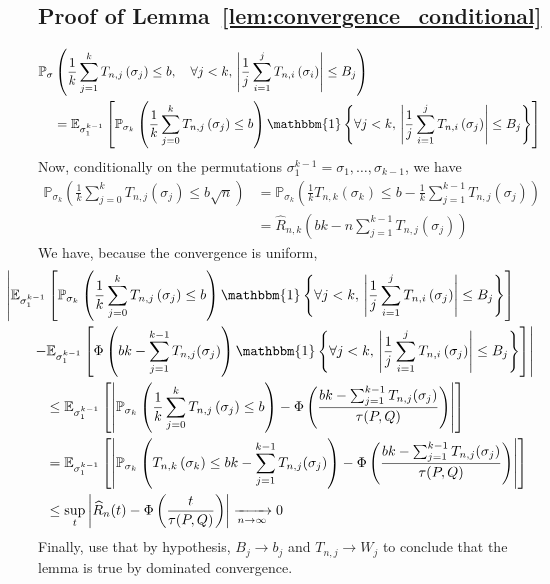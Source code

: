 \documentclass{article}
\theoremstyle{plain}
\theoremstyle{remark}
\renewcommand{\P}{\mathbb{P}}
\newcommand{\E}{\mathbb{E}}
\newcommand{\1}{\mathbbm{1}}
\numberwithin{equation}{section}
\begin{document}
\subsection{Proof of Lemma~\ref{lem:convergence_conditional}}\label{sec:proof_lem_conv}
\begin{align*}
\P_\sigma&\left(\frac{1}{k}\sum_{j=1}^k T_{n,j}\left(\sigma_j\right)\le b , \quad \forall j < k,\,  \left|\frac{1}{j}\sum_{i=1}^j T_{n,i}\left(\sigma_i\right)\right|\le  B_j  \right)\\
&= \E_{\sigma_1^{k-1}} \left[ \P_{\sigma_k}\left(\frac{1}{k}\sum_{j=0}^k T_{n,j}\left(\sigma_j\right)\le b \right)\1\left\{ \forall j < k,\,  \left|\frac{1}{j}\sum_{i=1}^j T_{n,i}\left(\sigma_j\right)\right|\le  B_j\right\}\right]
\end{align*}
Now, conditionally on the permutations $\sigma_1^{k-1}=\sigma_1,\dots,\sigma_{k-1}$, we have
\begin{align*}
\P_{\sigma_k}\left(\frac{1}{k}\sum_{j=0}^k T_{n,j}\left(\sigma_j\right)\le b \sqrt{n}\right) &= \P_{\sigma_k}\left( \frac{1}{k}T_{n,k}\left(\sigma_k\right)\le b -\frac{1}{k}\sum_{j=1}^{k-1}T_{n,j}\left(\sigma_j\right) \right)\\
&= \widehat{R}_{n,k}\left(bk-n\sum_{j=1}^{k-1}T_{n,j}\left(\sigma_j\right)\right)
\end{align*}
We have, because the convergence is uniform,
\begin{align*}
&\hspace{-3em}\left|\E_{\sigma_1^{k-1}} \left[ \P_{\sigma_k}\left(\frac{1}{k}\sum_{j=0}^k T_{n,j}\left(\sigma_j\right)\le b\right)\1\left\{ \forall j < k,\,  \left|\frac{1}{j}\sum_{i=1}^j T_{n,i}\left(\sigma_j\right)\right|\le  B_j\right\}\right]\right.\\
&\hspace{-1em}\left.- \E_{\sigma_1^{k-1}} \left[ \Phi\left( bk - \sum_{j=1}^{k-1}T_{n,j}(\sigma_j) \right)\1\left\{ \forall j < k,\,  \left|\frac{1}{j}\sum_{i=1}^j T_{n,i}\left(\sigma_j\right)\right|\le  B_j\right\}\right] \right|\\
&\le \E_{\sigma_1^{k-1}} \left[ \left|\P_{\sigma_k}\left(\frac{1}{k}\sum_{j=0}^k T_{n,j}\left(\sigma_j\right)\le b \right)- \Phi\left( \frac{bk - \sum_{j=1}^{k-1}T_{n,j}(\sigma_j) }{\tau(P,Q)}\right)\right|\right]\\
&= \E_{\sigma_1^{k-1}} \left[ \left|\P_{\sigma_k}\left( T_{n,k}\left(\sigma_k\right)\le bk - \sum_{j=1}^{k-1} T_{n,j}(\sigma_j) \right)- \Phi\left( \frac{bk - \sum_{j=1}^{k-1}T_{n,j}(\sigma_j) }{\tau(P,Q)}\right)\right|\right]\\
&\le \sup_t \left|\widehat{R}_n(t)-\Phi\left( \frac{t}{\tau(P,Q)}\right)\right|  \xrightarrow[n \to \infty]{}0
\end{align*}
Finally, use that by hypothesis, $B_j \to b_j$ and $T_{n,j} \to W_j$ to conclude that the lemma is true by dominated convergence.




\end{document}
